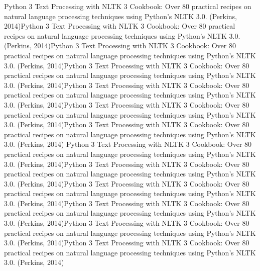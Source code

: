 Python 3 Text Processing with NLTK 3 Cookbook: Over 80 practical recipes on natural language processing techniques using Python's NLTK 3.0. (Perkins, 2014)Python 3 Text Processing with NLTK 3 Cookbook: Over 80 practical recipes on natural language processing techniques using Python's NLTK 3.0. (Perkins, 2014)Python 3 Text Processing with NLTK 3 Cookbook: Over 80 practical recipes on natural language processing techniques using Python's NLTK 3.0. (Perkins, 2014)Python 3 Text Processing with NLTK 3 Cookbook: Over 80 practical recipes on natural language processing techniques using Python's NLTK 3.0. (Perkins, 2014)Python 3 Text Processing with NLTK 3 Cookbook: Over 80 practical recipes on natural language processing techniques using Python's NLTK 3.0. (Perkins, 2014)Python 3 Text Processing with NLTK 3 Cookbook: Over 80 practical recipes on natural language processing techniques using Python's NLTK 3.0. (Perkins, 2014)Python 3 Text Processing with NLTK 3 Cookbook: Over 80 practical recipes on natural language processing techniques using Python's NLTK 3.0. (Perkins, 2014)
Python 3 Text Processing with NLTK 3 Cookbook: Over 80 practical recipes on natural language processing techniques using Python's NLTK 3.0. (Perkins, 2014)Python 3 Text Processing with NLTK 3 Cookbook: Over 80 practical recipes on natural language processing techniques using Python's NLTK 3.0. (Perkins, 2014)Python 3 Text Processing with NLTK 3 Cookbook: Over 80 practical recipes on natural language processing techniques using Python's NLTK 3.0. (Perkins, 2014)Python 3 Text Processing with NLTK 3 Cookbook: Over 80 practical recipes on natural language processing techniques using Python's NLTK 3.0. (Perkins, 2014)Python 3 Text Processing with NLTK 3 Cookbook: Over 80 practical recipes on natural language processing techniques using Python's NLTK 3.0. (Perkins, 2014)Python 3 Text Processing with NLTK 3 Cookbook: Over 80 practical recipes on natural language processing techniques using Python's NLTK 3.0. (Perkins, 2014)


